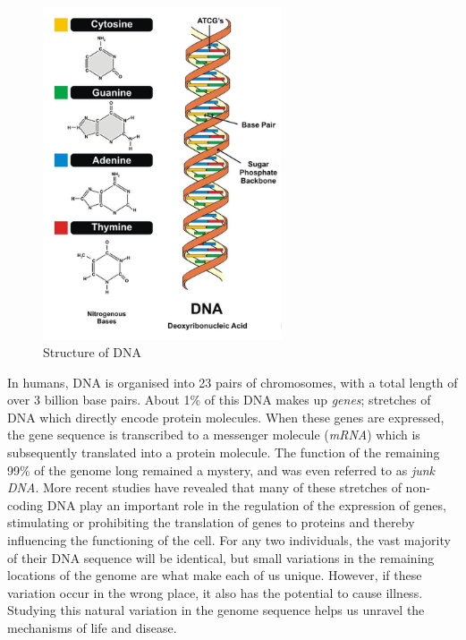 \begin{figure}
    \centering
    \includegraphics[width=200pt]{chapters/images/introduction/dna-structure.png}
    \caption{Structure of DNA}\label{fig:dnastructure}
\end{figure}

In humans, DNA is organised into 23 pairs of chromosomes, with a total length of over 3 billion base pairs. About 1\% of this DNA makes up \emph{genes}; stretches of DNA which directly encode protein molecules. When these genes are expressed, the gene sequence is transcribed to a messenger molecule (\emph{mRNA}) which is subsequently translated into a protein molecule. The function of the remaining 99\% of the genome long remained a mystery, and was even referred to as \emph{junk DNA}. More recent studies have revealed that many of these stretches of non-coding DNA play an important role in the regulation of the expression of genes, stimulating or prohibiting the translation of genes to proteins and thereby influencing the functioning of the cell. For any two individuals, the vast majority of their DNA sequence will be identical, but small variations in the remaining locations of the genome are what make each of us unique. However, if these variation occur in the wrong place, it also has the potential to cause illness. Studying this natural variation in the genome sequence helps us unravel the mechanisms of life and disease.

